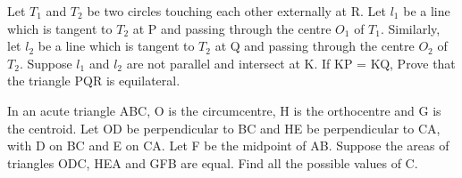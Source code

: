 \item Let $T_1$ and $T_2$ be two circles touching each other externally at R. Let $l_1$ be a line which is tangent to $T_2$ at P and passing through the centre $O_1$ of $T_1$. Similarly, let $l_2$ be a line which is tangent to $T_2$ at Q and passing through the centre $O_2$ of $T_2$. Suppose $l_1$ and $l_2$ are not parallel and intersect at K. If KP = KQ, Prove that the triangle PQR is equilateral.

\item In an acute triangle ABC, O is the circumcentre, H is the orthocentre and G is the centroid. Let OD be perpendicular to BC and HE be perpendicular to CA, with D on BC and E on CA. Let F be the midpoint of AB. Suppose the areas of triangles ODC, HEA and GFB are equal. Find all the possible values of C.





















